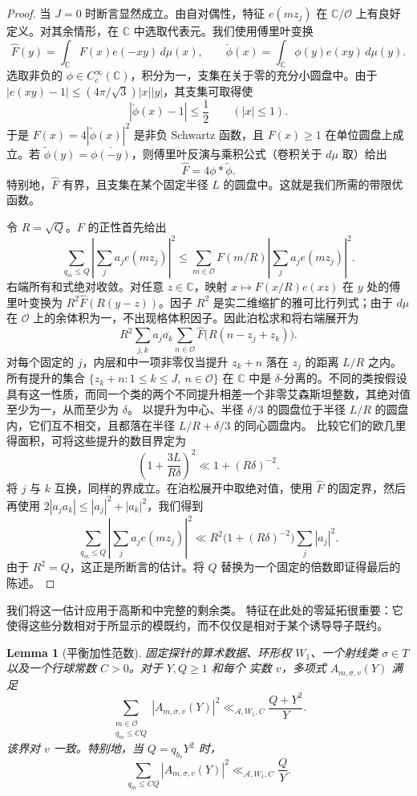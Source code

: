 \documentclass[11pt,a4paper]{article}
\numberwithin{equation}{section}
\numberwithin{figure}{section}
\newtheorem{lemma}[theorem]{Lemma}
\theoremstyle{definition}
\theoremstyle{remark}
\begin{document}
\begin{proof}
当 $J=0$ 时断言显然成立。由自对偶性，特征 $e(mz_j)$ 在 $\mathbb C/\mathcal O$ 上有良好定义。对其余情形，在 $\mathbb C$ 中选取代表元。我们使用傅里叶变换
\[
 \widehat F(y)=\int_{\mathbb C}F(x)e(-xy)\,d\mu(x),\qquad
 \check\phi(x)=\int_{\mathbb C}\phi(y)e(xy)\,d\mu(y).
\]
选取非负的 $\phi\in C_c^\infty(\mathbb C)$，积分为一，支集在关于零的充分小圆盘中。由于
$|e(xy)-1|\le (4\pi/\sqrt3)|x||y|$，其支集可取得使
\[
 |\check\phi(x)-1|\le\frac12\qquad(|x|\le1).
\]
于是 $F(x)=4|\check\phi(x)|^2$ 是非负 Schwartz 函数，且
$F(x)\ge1$ 在单位圆盘上成立。若
$\widetilde\phi(y)=\overline{\phi(-y)}$，则傅里叶反演与乘积公式（卷积关于 $d\mu$ 取）给出
\[
 \widehat F=4\phi*\widetilde\phi.
\]
特别地，$\widehat F$ 有界，且支集在某个固定半径 $L$ 的圆盘中。这就是我们所需的带限优函数。

令 $R=\sqrt Q$。$F$ 的正性首先给出
\[
 \sum_{q_m\le Q}\left|\sum_j a_je(mz_j)\right|^2
 \le \sum_{m\in\mathcal O}F(m/R)
                    \left|\sum_j a_je(mz_j)\right|^2.
\]
右端所有和式绝对收敛。对任意 $z\in\mathbb C$，映射 $x\mapsto F(x/R)e(xz)$ 在 $y$ 处的傅里叶变换为
$R^2\widehat F(R(y-z))$。因子 $R^2$ 是实二维缩扩的雅可比行列式；由于 $d\mu$ 在 $\mathcal O$ 上的余体积为一，不出现格体积因子。因此泊松求和将右端展开为
\[
 R^2\sum_{j,k}a_j\overline{a_k}
       \sum_{n\in\mathcal O}
       \widehat F\bigl(R(n-z_j+z_k)\bigr).
\]对每个固定的 $j$，内层和中一项非零仅当提升
$z_k+n$ 落在 $z_j$ 的距离 $L/R$ 之内。所有提升的集合
$\{z_k+n:1\le k\le J,\ n\in\mathcal O\}$ 在
$\mathbb C$ 中是 $\delta$-分离的。不同的类按假设具有这一性质，而同一个类的两个不同提升相差一个非零艾森斯坦整数，其绝对值至少为一，从而至少为 $\delta$。
以提升为中心、半径 $\delta/3$ 的圆盘位于半径 $L/R$ 的圆盘内，它们互不相交，且都落在半径 $L/R+\delta/3$ 的同心圆盘内。
比较它们的欧几里得面积，可将这些提升的数目界定为
\[
 \left(1+\frac{3L}{R\delta}\right)^2
 \ll 1+(R\delta)^{-2}.
\]
将 $j$ 与 $k$ 互换，同样的界成立。在泊松展开中取绝对值，使用 $\widehat F$ 的固定界，然后再使用 $2|a_ja_k|\le |a_j|^2+|a_k|^2$，我们得到
\[
 \sum_{q_m\le Q}\left|\sum_j a_je(mz_j)\right|^2
 \ll R^2\bigl(1+(R\delta)^{-2}\bigr)\sum_j|a_j|^2.
\]
由于 $R^2=Q$，这正是所断言的估计。将 $Q$ 替换为一个固定的倍数即证得最后的陈述。
\end{proof}

我们将这一估计应用于高斯和中完整的剩余类。
特征在此处的零延拓很重要：它使得这些分数相对于所显示的模既约，而不仅仅是相对于某个诱导导子既约。

\begin{lemma}[平衡加性范数]
\label{lem:balanced-additive-norm}
固定探针的算术数据、环形权 $W_1$、一个射线类
$\sigma\in T$ 以及一个行球常数 $C>0$。对于 $Y,Q\ge1$ 和每个
实数 $v$，多项式 $A_{m,\sigma,v}(Y)$ 满足
\[
 \sum_{\substack{m\in\mathcal O\\q_m\le CQ}}
       |A_{m,\sigma,v}(Y)|^2
 \ll_{\mathcal A,W_1,C}\frac{Q+Y^2}{Y}.
\]
该界对 $v$ 一致。特别地，当 $Q=q_{b_*}Y^2$ 时，
\[
 \sum_{q_m\le CQ}|A_{m,\sigma,v}(Y)|^2
 \ll_{\mathcal A,W_1,C}\frac QY.
\]
\end{lemma}
\end{document}
